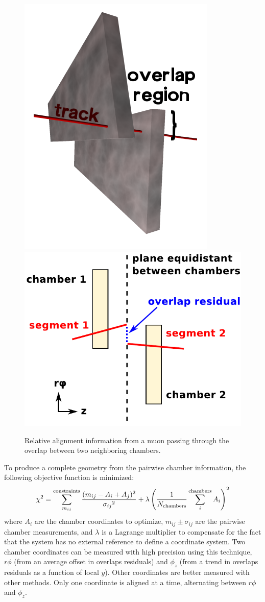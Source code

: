 \documentclass[12pt]{article}
\newcommand{\s}[1]{{\mbox{\scriptsize #1}}}
\begin{document}
\begin{figure}
\begin{center}
\includegraphics[height=4.5 cm]{overlaps.png} \hspace{1.5 cm}
\includegraphics[height=4.5 cm]{overlaps_diagram.pdf}
\end{center}

\caption{Relative alignment information from a muon passing through
  the overlap between two neighboring chambers. \label{fig:overlaps}}
\end{figure}

To produce a complete geometry from the pairwise chamber information,
the following objective function is minimized:
\begin{equation}
\chi^2 = \sum_{m_{ij}}^\s{constraints} \frac{(m_{ij} - A_i +
  A_j)^2}{{\sigma_{ij}}^2} + \lambda \left(\frac{1}{N_\s{chambers}} \sum_i^\s{chambers}A_i\right)^2
\label{eqn:minimizeme}
\end{equation}
where $A_i$ are the chamber coordinates to optimize, $m_{ij} \pm
\sigma_{ij}$ are the pairwise chamber measurements, and $\lambda$ is a
Lagrange multiplier to compensate for the fact that the system has no
external reference to define a coordinate system.  Two chamber
coordinates can be measured with high precision using this technique,
$r\phi$ (from an average offset in overlaps residuals) and $\phi_z$
(from a trend in overlaps residuals as a function of local $y$).
Other coordinates are better measured with other methods.  Only one
coordinate is aligned at a time, alternating between $r\phi$ and
$\phi_z$.
\end{document}
